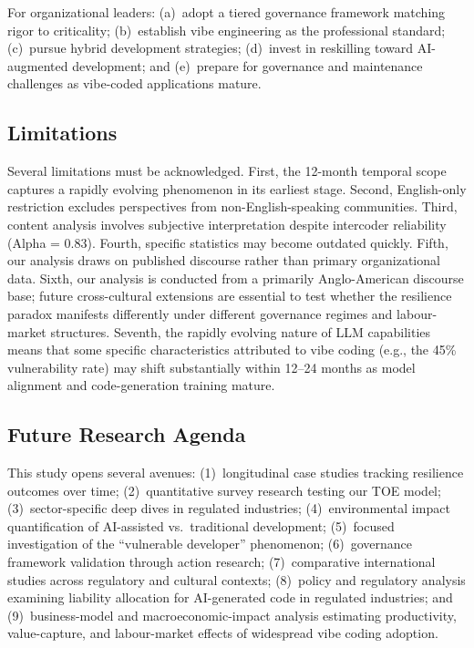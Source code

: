 \documentclass[preprint,12pt,authoryear]{elsarticle}
\begin{document}
For organizational leaders: (a)~adopt a tiered governance framework matching rigor to criticality; (b)~establish vibe engineering as the professional standard; (c)~pursue hybrid development strategies; (d)~invest in reskilling toward AI-augmented development; and (e)~prepare for governance and maintenance challenges as vibe-coded applications mature.


\subsection{Limitations}

Several limitations must be acknowledged. First, the 12-month temporal scope captures a rapidly evolving phenomenon in its earliest stage. Second, English-only restriction excludes perspectives from non-English-speaking communities. Third, content analysis involves subjective interpretation despite intercoder reliability (Alpha = 0.83). Fourth, specific statistics may become outdated quickly. Fifth, our analysis draws on published discourse rather than primary organizational data. Sixth, our analysis is conducted from a primarily Anglo-American discourse base; future cross-cultural extensions are essential to test whether the resilience paradox manifests differently under different governance regimes and labour-market structures. Seventh, the rapidly evolving nature of LLM capabilities means that some specific characteristics attributed to vibe coding (e.g., the 45\% vulnerability rate) may shift substantially within 12--24 months as model alignment and code-generation training mature.


\subsection{Future Research Agenda}

This study opens several avenues: (1)~longitudinal case studies tracking resilience outcomes over time; (2)~quantitative survey research testing our TOE model; (3)~sector-specific deep dives in regulated industries; (4)~environmental impact quantification of AI-assisted vs.\ traditional development; (5)~focused investigation of the ``vulnerable developer'' phenomenon; (6)~governance framework validation through action research; (7)~comparative international studies across regulatory and cultural contexts; (8)~policy and regulatory analysis examining liability allocation for AI-generated code in regulated industries; and (9)~business-model and macroeconomic-impact analysis estimating productivity, value-capture, and labour-market effects of widespread vibe coding adoption.
\end{document}
